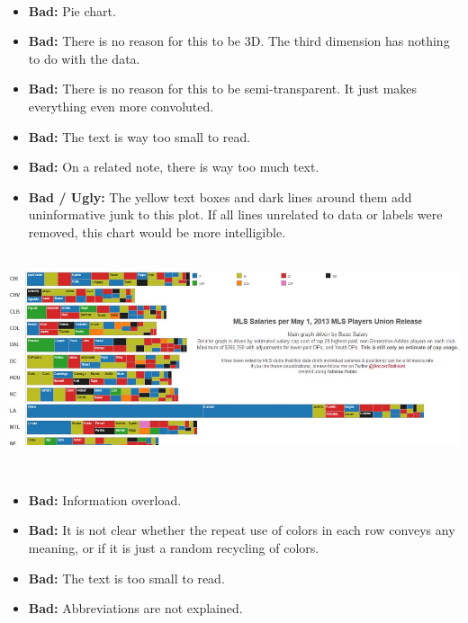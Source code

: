 \documentclass[
]{book}
\providecommand{\tightlist}{%
  \setlength{\itemsep}{0pt}\setlength{\parskip}{0pt}}
\begin{document}
~

\begin{itemize}
\tightlist
\item
  \textbf{Bad:} Pie chart.
\item
  \textbf{Bad:} There is no reason for this to be 3D. The third dimension has nothing to do with the data.
\item
  \textbf{Bad:} There is no reason for this to be semi-transparent. It just makes everything even more convoluted.
\item
  \textbf{Bad:} The text is way too small to read.
\item
  \textbf{Bad:} On a related note, there is way too much text.\\
\item
  \textbf{Bad / Ugly:} The yellow text boxes and dark lines around them add uninformative junk to this plot. If all lines unrelated to data or labels were removed, this chart would be more intelligible.
\end{itemize}

~\\

\includegraphics{img/vis7.jpeg}

~

\begin{itemize}
\tightlist
\item
  \textbf{Bad:} Information overload.
\item
  \textbf{Bad:} It is not clear whether the repeat use of colors in each row conveys any meaning, or if it is just a random recycling of colors.
\item
  \textbf{Bad:} The text is too small to read.\\
\item
  \textbf{Bad:} Abbreviations are not explained.
\end{itemize}

~\\
\end{document}
